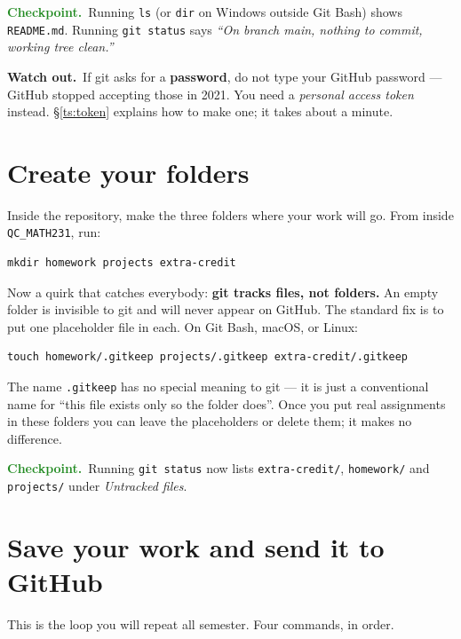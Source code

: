 \documentclass[11pt]{article}
\newcommand{\checkpoint}[1]{\par\smallskip\noindent
  {\small\sffamily\textcolor{ForestGreen}{\textbf{Checkpoint.}}\ #1}\par\smallskip}
\newcommand{\heads}[1]{\par\smallskip\noindent
  {\small\sffamily\textcolor{BrickRed}{\textbf{Watch out.}}\ #1}\par\smallskip}
\newcommand{\repname}{QC\_MATH231}
\begin{document}
\checkpoint{Running \texttt{ls} (or \texttt{dir} on Windows outside Git Bash)
shows \texttt{README.md}. Running \texttt{git status} says
\emph{``On branch main, nothing to commit, working tree clean.''}}

\heads{If git asks for a \textbf{password}, do not type your GitHub password ---
GitHub stopped accepting those in 2021. You need a \emph{personal access token}
instead. \S\ref{ts:token} explains how to make one; it takes about a minute.}

\section{Create your folders}\label{sec:folders}
Inside the repository, make the three folders where your work will go. From
inside \texttt{\repname}, run:

\begin{lstlisting}
mkdir homework projects extra-credit
\end{lstlisting}

\noindent Now a quirk that catches everybody: \textbf{git tracks files, not
folders.} An empty folder is invisible to git and will never appear on GitHub.
The standard fix is to put one placeholder file in each. On Git Bash, macOS, or
Linux:

\begin{lstlisting}
touch homework/.gitkeep projects/.gitkeep extra-credit/.gitkeep
\end{lstlisting}

\noindent The name \texttt{.gitkeep} has no special meaning to git --- it is
just a conventional name for ``this file exists only so the folder does''. Once
you put real assignments in these folders you can leave the placeholders or
delete them; it makes no difference.

\checkpoint{Running \texttt{git status} now lists \texttt{extra-credit/},
\texttt{homework/} and \texttt{projects/} under \emph{Untracked files}.}

\section{Save your work and send it to GitHub}\label{sec:workflow}
This is the loop you will repeat all semester. Four commands, in order.
\end{document}
